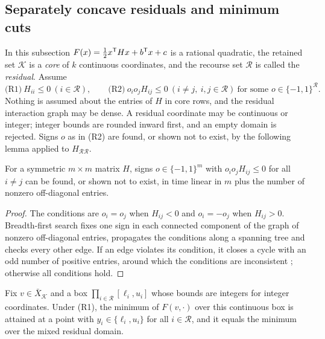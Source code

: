 \subsection{Separately concave residuals and minimum cuts}\label{sec:cuts}

In this subsection $F(x)=\frac12x^{\mathsf T}Hx+b^{\mathsf T}x+c$ is a rational quadratic,
the retained set $\mathcal K$ is a \emph{core} of $k$ continuous
coordinates, and the recourse set $\mathcal R$ is called the
\emph{residual}. Assume
\begin{equation}\label{eq:cr-class}
\text{(R1)}\ H_{ii}\le0\ (i\in\mathcal R),\qquad
\text{(R2)}\ o_io_jH_{ij}\le0\ (i\ne j,\ i,j\in\mathcal R)\ \text{for some }
o\in\{-1,1\}^{\mathcal R}.
\end{equation}
Nothing is assumed about the entries of $H$ in core rows, and the residual
interaction graph may be dense. A residual coordinate may be continuous or
integer; integer bounds are rounded inward first, and an empty domain is
rejected. Signs $o$ as in (R2) are found, or shown not to exist, by the
following lemma applied to $H_{\mathcal R\mathcal R}$.

\begin{lemma}\label{lem:balance}
For a symmetric $m\times m$ matrix $H$, signs $o\in\{-1,1\}^m$ with
$o_io_jH_{ij}\le0$ for all $i\ne j$ can be found, or shown not to exist, in
time linear in $m$ plus the number of nonzero off-diagonal entries.
\end{lemma}

\begin{proof}
The conditions are $o_i=o_j$ when $H_{ij}<0$ and $o_i=-o_j$ when
$H_{ij}>0$. Breadth-first search fixes one sign in each connected component
of the graph of nonzero off-diagonal entries, propagates the conditions
along a spanning tree and checks every other edge. If an edge violates its
condition, it closes a cycle with an odd number of positive entries, around
which the conditions are inconsistent \cite{Harary1953}; otherwise all
conditions hold.
\end{proof}

\begin{lemma}\label{lem:cr-endpoint}
Fix $v\in\bar X_{\mathcal K}$ and a box $\prod_{i\in\mathcal R}[\ell_i,u_i]$
whose bounds are integers for integer coordinates. Under (R1), the minimum
of $F(v,\cdot)$ over this continuous box is attained at a point with
$y_i\in\{\ell_i,u_i\}$ for all $i\in\mathcal R$, and it equals the minimum
over the mixed residual domain.
\end{lemma}

